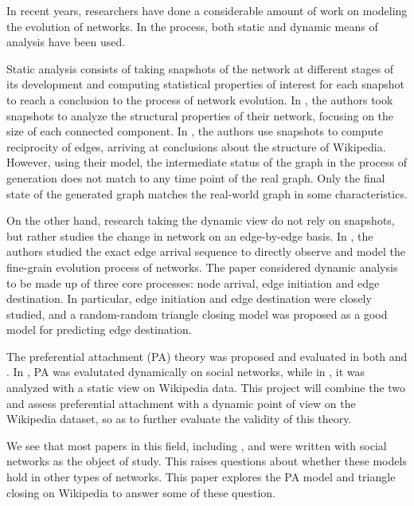 \documentclass[10pt,twocolumn]{article}
\begin{document}
In recent years, researchers have done a considerable amount of work on modeling the evolution of networks. In the process, both static and dynamic means of analysis have been used.

Static analysis consists of taking snapshots of the network at different stages of its development and computing statistical properties of interest for each snapshot to reach a conclusion to the process of network evolution. In \cite{kumar2010structure}, the authors took snapshots to analyze the structural properties of their network, focusing on the size of each connected component. In \cite{zlatic2011model}, the authors use snapshots to compute reciprocity of edges, arriving at conclusions about the structure of Wikipedia. However, using their model, the intermediate status of the graph in the process of generation does not match to any time point of the real graph. Only the final state of the generated graph matches the real-world graph in some characteristics.

On the other hand, research taking the dynamic view do not rely on snapshots, but rather studies the change in network on an edge-by-edge basis. In \cite{leskovec2008microscopic}, the authors studied the exact edge arrival sequence to directly observe and model the fine-grain evolution process of networks. The paper considered dynamic analysis to be made up of three core processes: node arrival, edge initiation and edge destination. In particular, edge initiation and edge destination were closely studied, and a random-random triangle closing model was proposed as a good model for predicting edge destination.

The preferential attachment (PA) theory was proposed and evaluated in both \cite{leskovec2008microscopic} and \cite{zlatic2011model}. In \cite{leskovec2008microscopic}, PA was evalutated dynamically on social networks, while in \cite{zlatic2011model}, it was analyzed with a static view on Wikipedia data. This project will combine the two and assess preferential attachment with a dynamic point of view on the Wikipedia dataset, so as to further evaluate the validity of this theory.

We see that most papers in this field, including \cite{leskovec2008microscopic}, \cite{kossinets2006empirical} and \cite{kumar2010structure} were written with social networks as the object of study. This raises questions about whether these models hold in other types of networks. This paper explores the PA model and triangle closing on Wikipedia to answer some of these question.
\end{document}
